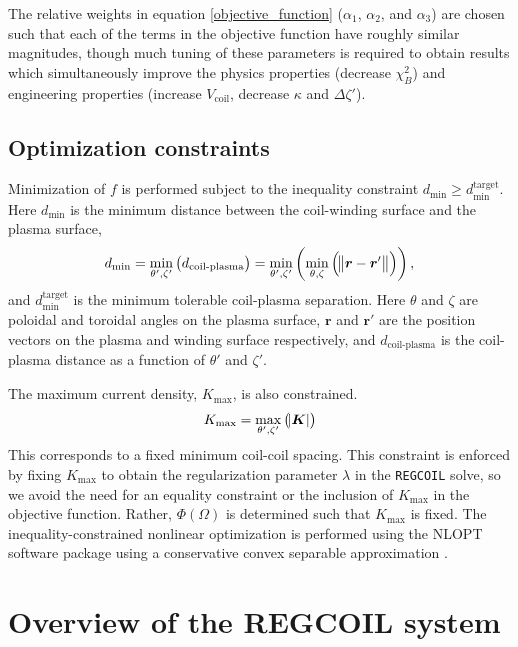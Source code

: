 \documentclass[aps,unsortedaddress]{revtex4-1}
\begin{document}
The relative weights in equation \ref{objective_function} ($\alpha_1$, $\alpha_2$, and $\alpha_3$) are chosen such that each of the terms in the objective function have roughly similar magnitudes, though much tuning of these parameters is required to obtain results which simultaneously improve the physics properties (decrease $\chi^2_B$) and engineering properties (increase $V_{\text{coil}}$, decrease $\kappa$ and $\Delta \zeta'$).

\subsection{Optimization constraints}
\label{sect_constraint}

Minimization of $f$ is performed subject to the inequality constraint $d_{\text{min}} \geq d_{\text{min}}^{\text{target}}$. Here $d_{\text{min}}$ is the minimum distance between the coil-winding surface and the plasma surface,
\begin{gather}
d_{\text{min}} = \min_{\theta',\zeta'} \left( d_{\text{coil-plasma}} \right) = \min_{\theta',\zeta'} \left( \min_{\theta, \zeta} \left( \norm{ \bm{r} - \bm{r}' } \right) \right),
\end{gather}
and $d_{\text{min}}^{\text{target}}$ is the minimum tolerable coil-plasma separation. Here $\theta$ and $\zeta$ are poloidal and toroidal angles on the plasma surface, $\bm{r}$ and $\bm{r}'$ are the position vectors on the plasma and winding surface respectively, and $d_{\text{coil-plasma}}$ is the coil-plasma distance as a function of $\theta'$ and $\zeta'$. 

The maximum current density, $K_{\text{max}}$, is also constrained. 
\begin{gather}
K_{\text{max}} = \max_{\theta',\zeta'} \left( \abs{\bm{K}} \right)
\end{gather}
This corresponds to a fixed minimum coil-coil spacing. This constraint is enforced by fixing $K_{\text{max}}$ to obtain the regularization parameter $\lambda$ in the \texttt{REGCOIL} solve, so we avoid the need for an equality constraint or the inclusion of $K_{\text{max}}$ in the objective function. Rather, $\Phi(\Omega)$ is determined such that $K_{\text{max}}$ is fixed. The inequality-constrained nonlinear optimization is performed using the NLOPT \cite{NLOPT} software package using a conservative convex separable approximation \cite{Svanberg2002}. 

\section{Overview of the REGCOIL system}
\label{section_REGCOIL}
\end{document}
